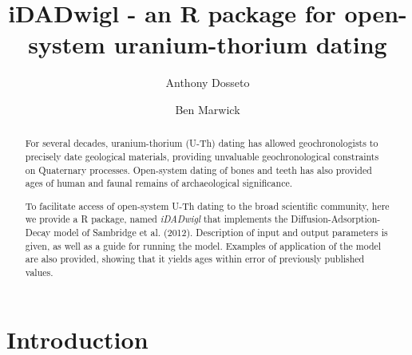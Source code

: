 \documentclass[]{elsarticle} %
\begin{document}
\begin{frontmatter}

  \title{iDADwigl - an R package for open-system uranium-thorium dating}
    \author[University of Wollongong]{Anthony Dosseto}
    \author[University of Washington]{Ben Marwick}
  
      \address[University of Wollongong]{Wollongong Isotope Geochronology Laboratory, School of Earth, Atmosphere \& Life Sciences, University of Wollongong, Wollongong NSW Australia}
    \address[University of Washington]{Department of Anthropology, University of Washington, Seattle, WA, USA}
  
  \begin{abstract}
  For several decades, uranium-thorium (U-Th) dating has allowed geochronologists to precisely date geological materials, providing unvaluable geochronological constraints on Quaternary processes. Open-system dating of bones and teeth has also provided ages of human and faunal remains of archaeological significance.
  
  To facilitate access of open-system U-Th dating to the broad scientific community, here we provide a R package, named \emph{iDADwigl} that implements the Diffusion-Adsorption-Decay model of Sambridge et al. (2012). Description of input and output parameters is given, as well as a guide for running the model. Examples of application of the model are also provided, showing that it yields ages within error of previously published values.\\
  \end{abstract}
  
 \end{frontmatter}

\newpage
\linenumbers

\hypertarget{introduction}{%
\section{Introduction}\label{introduction}}
\end{document}
